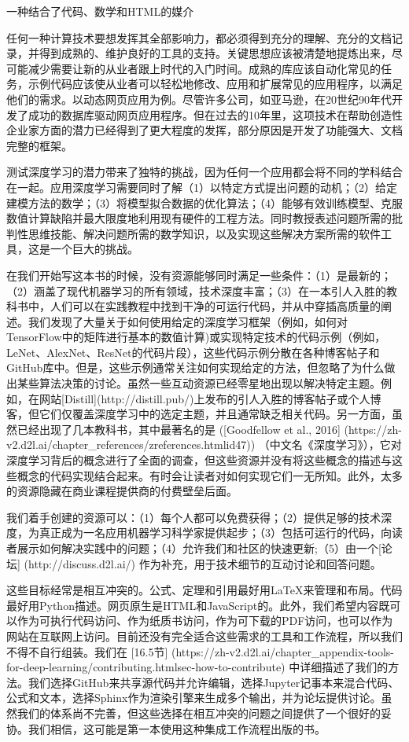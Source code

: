 一种结合了代码、数学和HTML的媒介

任何一种计算技术要想发挥其全部影响力，都必须得到充分的理解、充分的文档记录，并得到成熟的、维护良好的工具的支持。关键思想应该被清楚地提炼出来，尽可能减少需要让新的从业者跟上时代的入门时间。成熟的库应该自动化常见的任务，示例代码应该使从业者可以轻松地修改、应用和扩展常见的应用程序，以满足他们的需求。以动态网页应用为例。尽管许多公司，如亚马逊，在20世纪90年代开发了成功的数据库驱动网页应用程序。但在过去的10年里，这项技术在帮助创造性企业家方面的潜力已经得到了更大程度的发挥，部分原因是开发了功能强大、文档完整的框架。

测试深度学习的潜力带来了独特的挑战，因为任何一个应用都会将不同的学科结合在一起。应用深度学习需要同时了解（1）以特定方式提出问题的动机；（2）给定建模方法的数学；（3）将模型拟合数据的优化算法；（4）能够有效训练模型、克服数值计算缺陷并最大限度地利用现有硬件的工程方法。同时教授表述问题所需的批判性思维技能、解决问题所需的数学知识，以及实现这些解决方案所需的软件工具，这是一个巨大的挑战。

在我们开始写这本书的时候，没有资源能够同时满足一些条件：（1）是最新的；（2）涵盖了现代机器学习的所有领域，技术深度丰富；（3）在一本引人入胜的教科书中，人们可以在实践教程中找到干净的可运行代码，并从中穿插高质量的阐述。我们发现了大量关于如何使用给定的深度学习框架（例如，如何对TensorFlow中的矩阵进行基本的数值计算)或实现特定技术的代码示例（例如，LeNet、AlexNet、ResNet的代码片段），这些代码示例分散在各种博客帖子和GitHub库中。但是，这些示例通常关注如何实现给定的方法，但忽略了为什么做出某些算法决策的讨论。虽然一些互动资源已经零星地出现以解决特定主题。例如，在网站[Distill](http://distill.pub/)上发布的引人入胜的博客帖子或个人博客，但它们仅覆盖深度学习中的选定主题，并且通常缺乏相关代码。另一方面，虽然已经出现了几本教科书，其中最著名的是 ([Goodfellow et al., 2016]
(https://zh-v2.d2l.ai/chapter\_references/zreferences.htmlid47))
（中文名《深度学习》），它对深度学习背后的概念进行了全面的调查，但这些资源并没有将这些概念的描述与这些概念的代码实现结合起来。有时会让读者对如何实现它们一无所知。此外，太多的资源隐藏在商业课程提供商的付费壁垒后面。

我们着手创建的资源可以：（1）每个人都可以免费获得；（2）提供足够的技术深度，为真正成为一名应用机器学习科学家提供起步；（3）包括可运行的代码，向读者展示如何解决实践中的问题；（4）允许我们和社区的快速更新;（5）由一个[论坛]
(http://discuss.d2l.ai/)
作为补充，用于技术细节的互动讨论和回答问题。

这些目标经常是相互冲突的。公式、定理和引用最好用LaTeX来管理和布局。代码最好用Python描述。网页原生是HTML和JavaScript的。此外，我们希望内容既可以作为可执行代码访问、作为纸质书访问，作为可下载的PDF访问，也可以作为网站在互联网上访问。目前还没有完全适合这些需求的工具和工作流程，所以我们不得不自行组装。我们在 [16.5节]
(https://zh-v2.d2l.ai/chapter\_appendix-tools-for-deep-learning/contributing.htmlsec-how-to-contribute) 
中详细描述了我们的方法。我们选择GitHub来共享源代码并允许编辑，选择Jupyter记事本来混合代码、公式和文本，选择Sphinx作为渲染引擎来生成多个输出，并为论坛提供讨论。虽然我们的体系尚不完善，但这些选择在相互冲突的问题之间提供了一个很好的妥协。我们相信，这可能是第一本使用这种集成工作流程出版的书。


